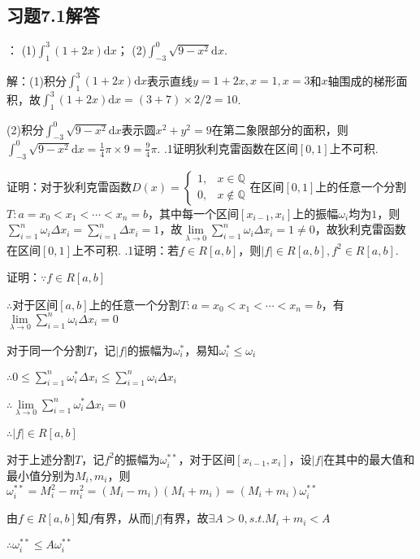\documentclass[12pt,UTF8]{ctexart}
\begin{document}
\subsection{习题7.1解答}
\begin{enumerate}
：
\newline
(1)$\int_1^3(1+2x)\mathrm dx$；
\newline
(2)$\int_{-3}^0\sqrt{9-x^2}\mathrm dx$.

解：(1)积分$\int_1^3(1+2x)\mathrm dx$表示直线$y=1+2x,x=1,x=3$和$x$轴围成的梯形面积，故$\int_1^3(1+2x)\mathrm dx=(3+7)\times2/2=10$.

(2)积分$\int_{-3}^0\sqrt{9-x^2}\mathrm dx$表示圆$x^2+y^2=9$在第二象限部分的面积，则$\int_{-3}^0\sqrt{9-x^2}\mathrm dx=\frac14\pi\times9=\frac94\pi$.
.1证明狄利克雷函数在区间$[0,1]$上不可积.

证明：对于狄利克雷函数$D(x)=\begin{cases}
1,&x\in\mathbb Q\\
0,&x\notin\mathbb Q
\end{cases}$在区间$[0,1]$上的任意一个分割$T:a=x_0<x_1<\cdots<x_n=b$，其中每一个区间$[x_{i-1},x_i]$上的振幅$\omega_i$均为$1$，则$\sum_{i=1}^n\omega_i\Delta x_i=\sum_{i=1}^n\Delta x_i=1$，故$\lim\limits_{\lambda\rightarrow0}\sum_{i=1}^n\omega_i\Delta x_i=1\neq0$，故狄利克雷函数在区间$[0,1]$上不可积.
.1证明：若$f\in R[a,b]$，则$|f|\in R[a,b],f^2\in R[a,b]$.

证明：$\because f\in R[a,b]$

$\therefore$对于区间$[a,b]$上的任意一个分割$T:a=x_0<x_1<\cdots<x_n=b$，有$\lim\limits_{\lambda\rightarrow0}\sum_{i=1}^n\omega_i\Delta x_i=0$

对于同一个分割$T$，记$|f|$的振幅为$\omega_i^*$，易知$\omega_i^*\leq\omega_i$

$\therefore0\leq\sum_{i=1}^n\omega_i^*\Delta x_i\leq\sum_{i=1}^n\omega_i\Delta x_i$

$\therefore\lim\limits_{\lambda\rightarrow0}\sum_{i=1}^n\omega_i^*\Delta x_i=0$

$\therefore|f|\in R[a,b]$

对于上述分割$T$，记$f^2$的振幅为$\omega_i^{**}$，对于区间$[x_{i-1},x_i]$，设$|f|$在其中的最大值和最小值分别为$M_i,m_i$，则$\omega_i^{**}=M_i^2-m_i^2=(M_i-m_i)(M_i+m_i)=(M_i+m_i)\omega_i^{**}$

由$f\in R[a,b]$知$f$有界，从而$|f|$有界，故$\exists A>0,s.t.M_i+m_i<A$

$\therefore\omega_i^{**}\leq A\omega_i^{**}$


\end{enumerate}
\end{document}
